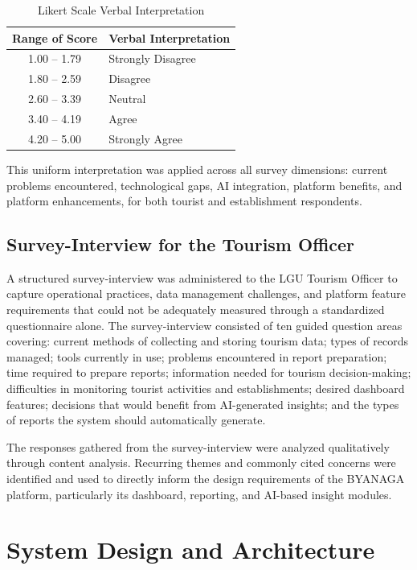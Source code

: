 \documentclass{research}
\begin{document}
\begin{table}[h]
    \centering
    \caption{Likert Scale Verbal Interpretation}
    \label{tab:likert_scale}
    \begin{tabular}{|c|l|}
        \hline
        \textbf{Range of Score} & \textbf{Verbal Interpretation} \\
        \hline
        1.00 -- 1.79 & Strongly Disagree \\
        1.80 -- 2.59 & Disagree \\
        2.60 -- 3.39 & Neutral \\
        3.40 -- 4.19 & Agree \\
        4.20 -- 5.00 & Strongly Agree \\
        \hline
    \end{tabular}
\end{table}

This uniform interpretation was applied across all survey dimensions: current problems encountered, technological gaps, AI integration, platform benefits, and platform enhancements, for both tourist and establishment respondents.

\subsection*{Survey-Interview for the Tourism Officer}
A structured survey-interview was administered to the LGU Tourism Officer to capture operational practices, data management challenges, and platform feature requirements that could not be adequately measured through a standardized questionnaire alone. The survey-interview consisted of ten guided question areas covering: current methods of collecting and storing tourism data; types of records managed; tools currently in use; problems encountered in report preparation; time required to prepare reports; information needed for tourism decision-making; difficulties in monitoring tourist activities and establishments; desired dashboard features; decisions that would benefit from AI-generated insights; and the types of reports the system should automatically generate.

The responses gathered from the survey-interview were analyzed qualitatively through content analysis. Recurring themes and commonly cited concerns were identified and used to directly inform the design requirements of the BYANAGA platform, particularly its dashboard, reporting, and AI-based insight modules.

\section{System Design and Architecture}
\end{document}
